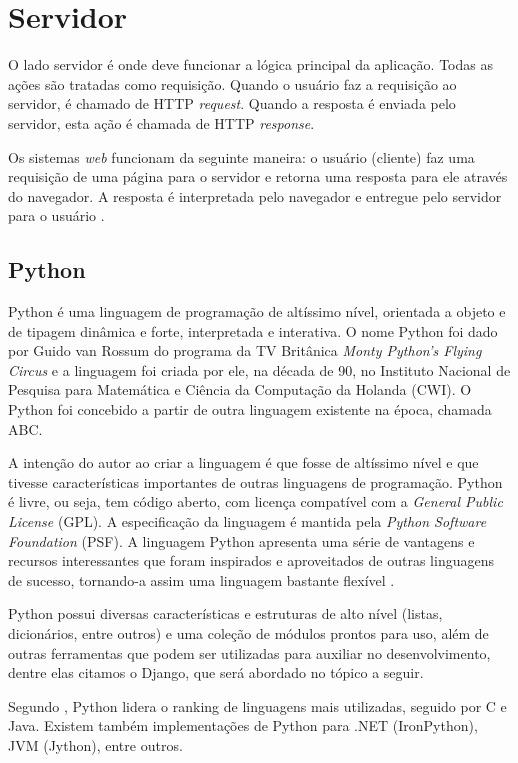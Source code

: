 \documentclass[
	12pt,				%
    oneside,			%
	a4paper,			%
	english,			%
	french,				%
	spanish,			%
	brazil,				%
	]{abntex2}
\begin{document}
\section{Servidor}

O lado servidor é onde deve funcionar a lógica principal da aplicação. Todas as
ações são tratadas como requisição. Quando o usuário faz a requisição ao servidor,
é chamado de HTTP \textit{request}. Quando a resposta é enviada pelo servidor, esta ação
é chamada de HTTP \textit{response}.

Os sistemas \textit{web} funcionam da seguinte maneira: o usuário (cliente) faz uma
requisição de uma página para o servidor e retorna uma resposta para ele através do
navegador. A resposta é interpretada pelo navegador e entregue pelo servidor para o
usuário \cite{niederauer}.

\subsection{Python}

Python é uma linguagem de programação de altíssimo nível, orientada a objeto
e de tipagem dinâmica e forte, interpretada e interativa. O nome Python foi dado por
Guido van Rossum do programa da TV Britânica \textit{Monty Python’s Flying Circus} e a
linguagem foi criada por ele, na década de 90, no Instituto Nacional de Pesquisa para
Matemática e Ciência da Computação da Holanda (CWI). O Python foi concebido a
partir de outra linguagem existente na época, chamada ABC.

A intenção do autor ao criar a linguagem é que fosse de altíssimo nível e que
tivesse características importantes de outras linguagens de programação. Python é
livre, ou seja, tem código aberto, com licença compatível com a \textit{General Public License}
(GPL). A especificação da linguagem é mantida pela \textit{\textit{Python Software Foundation}}
(PSF). A linguagem Python apresenta uma série de vantagens e recursos
interessantes que foram inspirados e aproveitados de outras linguagens de sucesso,
tornando-a assim uma linguagem bastante flexível \cite{borges}.

Python possui diversas características e estruturas de alto nível (listas,
dicionários, entre outros) e uma coleção de módulos prontos para uso, além de outras
ferramentas que podem ser utilizadas para auxiliar no desenvolvimento, dentre elas
citamos o Django, que será abordado no tópico a seguir.

Segundo , Python lidera o ranking de linguagens
mais utilizadas, seguido por C e Java. Existem também implementações de Python
para .NET (IronPython), JVM (Jython), entre outros.
\end{document}
